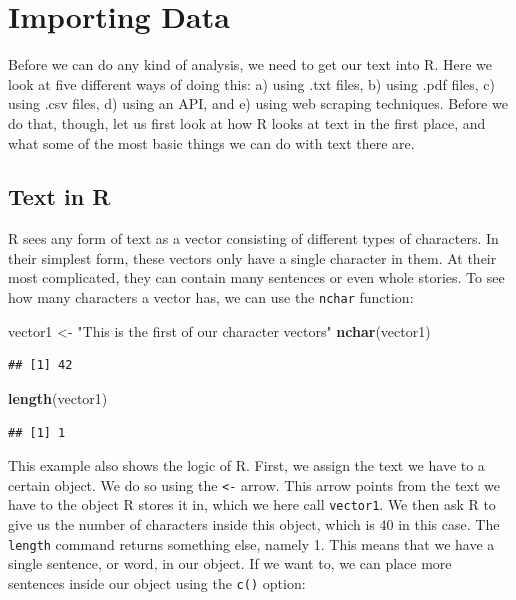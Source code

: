 \documentclass[
]{book}
\newenvironment{Shaded}{\begin{snugshade}}{\end{snugshade}}
\newcommand{\FunctionTok}[1]{\textcolor[rgb]{0.13,0.29,0.53}{\textbf{#1}}}
\newcommand{\NormalTok}[1]{#1}
\newcommand{\OtherTok}[1]{\textcolor[rgb]{0.56,0.35,0.01}{#1}}
\newcommand{\StringTok}[1]{\textcolor[rgb]{0.31,0.60,0.02}{#1}}
\begin{document}
\chapter{Importing Data}\label{importing-data}

Before we can do any kind of analysis, we need to get our text into R. Here we look at five different ways of doing this: a) using .txt files, b) using .pdf files, c) using .csv files, d) using an API, and e) using web scraping techniques. Before we do that, though, let us first look at how R looks at text in the first place, and what some of the most basic things we can do with text there are.

\section{Text in R}\label{text-in-r}

R sees any form of text as a vector consisting of different types of characters. In their simplest form, these vectors only have a single character in them. At their most complicated, they can contain many sentences or even whole stories. To see how many characters a vector has, we can use the \texttt{nchar} function:

\begin{Shaded}
\begin{Highlighting}[]
\NormalTok{vector1 }\OtherTok{\textless{}{-}} \StringTok{"This is the first of our character vectors"}
\FunctionTok{nchar}\NormalTok{(vector1)}
\end{Highlighting}
\end{Shaded}

\begin{verbatim}
## [1] 42
\end{verbatim}

\begin{Shaded}
\begin{Highlighting}[]
\FunctionTok{length}\NormalTok{(vector1)}
\end{Highlighting}
\end{Shaded}

\begin{verbatim}
## [1] 1
\end{verbatim}

This example also shows the logic of R. First, we assign the text we have to a certain object. We do so using the \texttt{\textless{}-} arrow. This arrow points from the text we have to the object R stores it in, which we here call \texttt{vector1}. We then ask R to give us the number of characters inside this object, which is 40 in this case. The \texttt{length} command returns something else, namely 1. This means that we have a single sentence, or word, in our object. If we want to, we can place more sentences inside our object using the \texttt{c()} option:
\end{document}
